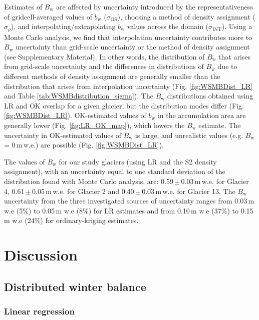 \documentclass[review,oneside, letterpaper]{igs}
\begin{document}
Estimates of $B_\mathrm{w}$ are affected by uncertainty introduced by the representativeness of gridcell-averaged values of $b_\mathrm{w}$ ($\sigma_{\mathrm{GS}}$), choosing a method of density assignment ($\sigma_{\rho}$), and interpolating/extrapolating $b_\mathrm{w}$ values across the domain ($\sigma_{\mathrm{INT}}$). Using a Monte Carlo analysis, we find that interpolation uncertainty contributes more to $B_\mathrm{w}$ uncertainty than grid-scale uncertainty or the method of density assignment (see Supplementary Material). In other words, the distribution of $B_\mathrm{w}$ that arises from grid-scale uncertainty and the differences in distributions of $B_\mathrm{w}$ due to different methods of density assignment are generally smaller than the distribution that arises from interpolation uncertainty (Fig. \ref{fig:WSMBDist_LR} and Table \ref{tab:WSMBdistribution_sigma}). The $B_\mathrm{w}$ distributions obtained using LR and OK overlap for a given glacier, but the distribution modes differ (Fig. \ref{fig:WSMBDist_LR}). OK-estimated values of $b_\mathrm{w}$ in the accumulation area are generally lower (Fig. \ref{fig:LR_OK_map}), which lowers the $B_\mathrm{w}$ estimate. The uncertainty in OK-estimated values of $B_\mathrm{w}$ is large, and unrealistic values (e.g. $B_\mathrm{w}$ = 0\,m\,w.e.)  are possible (Fig. \ref{fig:WSMBDist_LR}).

The values of $B_\mathrm{w}$ for our study glaciers (using LR and the S2 density assignment), with an uncertainty equal to one standard deviation of the distribution found with Monte Carlo analysis, are: 0.59\,$\pm$\,0.03\,m\,w.e. for Glacier 4, 0.61\,$\pm$\,0.05\,m\,w.e. for Glacier 2 and 0.40\,$\pm$\,0.03\,m\,w.e. for Glacier 13. The $B_\mathrm{w}$ uncertainty from the three investigated sources of uncertainty ranges from 0.03\,m w.e (5\%) to 0.05\,m w.e (8\%) for LR estimates and from 0.10\,m w.e (37\%) to 0.15\,m w.e (24\%) for ordinary-kriging estimates.

\section{Discussion}

\subsection{Distributed winter balance}

\subsubsection{Linear regression}
\end{document}
